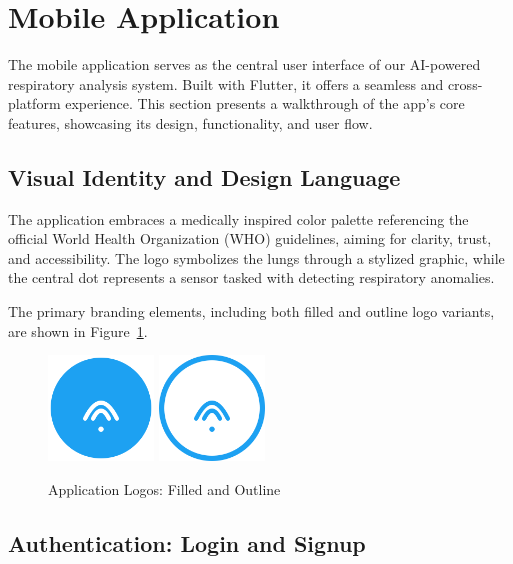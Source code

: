 \section{Mobile Application}
\label{sec:mobile_application}

The mobile application serves as the central user interface of our AI-powered respiratory analysis system. Built with Flutter, it offers a seamless and cross-platform experience. This section presents a walkthrough of the app’s core features, showcasing its design, functionality, and user flow.

\subsection{Visual Identity and Design Language}

The application embraces a medically inspired color palette referencing the official World Health Organization (WHO) guidelines, aiming for clarity, trust, and accessibility. The logo symbolizes the lungs through a stylized graphic, while the central dot represents a sensor tasked with detecting respiratory anomalies.

The primary branding elements, including both filled and outline logo variants, are shown in Figure~\ref{fig:app_logos}.

\begin{figure}[H]
    \centering
    \includegraphics[width=0.25\textwidth]{images/UI_Screenshots/logo_filled.png}
    \hspace{2em}
    \includegraphics[width=0.25\textwidth]{images/UI_Screenshots/logo_unfilled.png}
    \caption{Application Logos: Filled and Outline}
    \label{fig:app_logos}
\end{figure}

\subsection{Authentication: Login and Signup}

